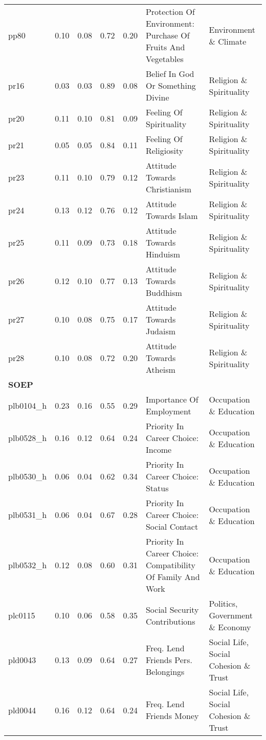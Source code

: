 \begin{longtable}{l|rrrrll}
pp80 & 0.10 & 0.08 & 0.72 & 0.20 & Protection Of Environment: Purchase Of Fruits And Vegetables & Environment \& Climate \\ 
pr16 & 0.03 & 0.03 & 0.89 & 0.08 & Belief In God Or Something Divine & Religion \& Spirituality \\ 
pr20 & 0.11 & 0.10 & 0.81 & 0.09 & Feeling Of Spirituality & Religion \& Spirituality \\ 
pr21 & 0.05 & 0.05 & 0.84 & 0.11 & Feeling Of Religiosity & Religion \& Spirituality \\ 
pr23 & 0.11 & 0.10 & 0.79 & 0.12 & Attitude Towards Christianism & Religion \& Spirituality \\ 
pr24 & 0.13 & 0.12 & 0.76 & 0.12 & Attitude Towards Islam & Religion \& Spirituality \\ 
pr25 & 0.11 & 0.09 & 0.73 & 0.18 & Attitude Towards Hinduism & Religion \& Spirituality \\ 
pr26 & 0.12 & 0.10 & 0.77 & 0.13 & Attitude Towards Buddhism & Religion \& Spirituality \\ 
pr27 & 0.10 & 0.08 & 0.75 & 0.17 & Attitude Towards Judaism & Religion \& Spirituality \\ 
pr28 & 0.10 & 0.08 & 0.72 & 0.20 & Attitude Towards Atheism & Religion \& Spirituality \\ 
\midrule
\multicolumn{7}{l}{\textbf{SOEP}} \\ 
\midrule
plb0104\_h & 0.23 & 0.16 & 0.55 & 0.29 & Importance Of Employment & Occupation \& Education \\ 
plb0528\_h & 0.16 & 0.12 & 0.64 & 0.24 & Priority In Career Choice: Income & Occupation \& Education \\ 
plb0530\_h & 0.06 & 0.04 & 0.62 & 0.34 & Priority In Career Choice: Status & Occupation \& Education \\ 
plb0531\_h & 0.06 & 0.04 & 0.67 & 0.28 & Priority In Career Choice: Social Contact & Occupation \& Education \\ 
plb0532\_h & 0.12 & 0.08 & 0.60 & 0.31 & Priority In Career Choice: Compatibility Of Family And Work & Occupation \& Education \\ 
plc0115 & 0.10 & 0.06 & 0.58 & 0.35 & Social Security Contributions & Politics, Government \& Economy \\ 
pld0043 & 0.13 & 0.09 & 0.64 & 0.27 & Freq. Lend Friends Pers. Belongings & Social Life, Social Cohesion \& Trust \\ 
pld0044 & 0.16 & 0.12 & 0.64 & 0.24 & Freq. Lend Friends Money & Social Life, Social Cohesion \& Trust \\ 

\end{longtable}
